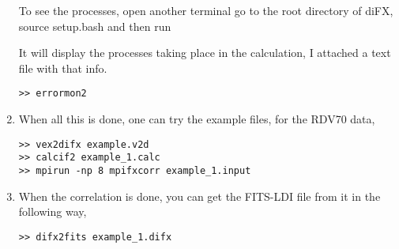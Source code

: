 \begin{enumerate}
To see the processes, open another terminal go to the root directory of diFX, source setup.bash and then run

It will display the processes taking place in the calculation, I attached a text file with that info.
\begin{verbatim}
>> errormon2
\end{verbatim}

\item When all this is done, one can try the example files, for the RDV70 data,
\begin{verbatim}
>> vex2difx example.v2d
>> calcif2 example_1.calc
>> mpirun -np 8 mpifxcorr example_1.input
\end{verbatim}


\item When the correlation is done, you can get the FITS-LDI file from it in the following way,

\begin{verbatim}
>> difx2fits example_1.difx
\end{verbatim}


\end{enumerate}
   